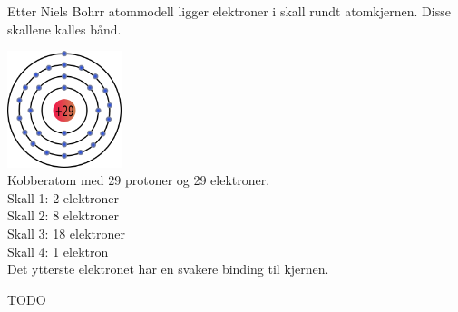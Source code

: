 Etter Niels Bohrr atommodell ligger elektroner i skall rundt atomkjernen.
Disse skallene kalles bånd.

\includegraphics[width=0.25\textwidth]{./img/bohr-Cu}
\\
Kobberatom med 29 protoner og 29 elektroner.\\
Skall 1: 2 elektroner \\
Skall 2: 8 elektroner \\
Skall 3: 18 elektroner \\
Skall 4: 1 elektron
\\
Det ytterste elektronet har en svakere binding til kjernen.

TODO
